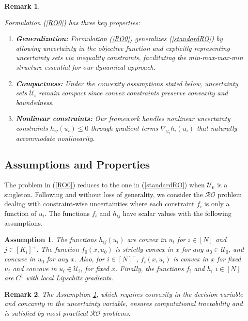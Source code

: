 \documentclass[journal,twoside,web]{ieeecolor}
\newcommand{\rev}[1]{\textcolor{revisionblue}{#1}}
\newtheorem{assumption}[theorem]{Assumption}
\newtheorem{remark}{Remark}
\begin{document}
\begin{remark} \rev{Formulation (\ref{RO0}) has three key properties:
\begin{enumerate}
\item \textbf{Generalization:} Formulation (\ref{RO0}) generalizes (\ref{standardRO}) by allowing uncertainty in the objective function and explicitly representing uncertainty sets via inequality constraints, facilitating the min-max-max-min structure essential for our dynamical approach.
\item \textbf{Compactness:} Under the convexity assumptions stated below, uncertainty sets $\mathcal{U}_i$ remain compact since convex constraints preserve convexity and boundedness.
\item \textbf{Nonlinear constraints:} Our framework handles nonlinear uncertainty constraints $h_{ij}(u_i) \leq 0$ through gradient terms $\nabla_{u_i} h_i(u_i)$ that naturally accommodate nonlinearity.
\end{enumerate}}
\end{remark}

\subsection*{\rev{Assumptions and Properties}}

The problem in (\ref{RO0}) reduces to the one in (\ref{standardRO}) when $\mathcal{U}_0$ is a singleton.
Following \cite{bental2009-2} and without loss of generality, we consider the $\mathcal{RO}$ problem dealing with constraint-wise uncertainties where each constraint $f_i$ is only a function of $u_i$.
The functions $f_i$ and $h_{ij}$ have scalar values with the following assumptions.

\begin{assumption}\label{assume1} The functions $h_{ij}(u_i)$ are convex in $u_i$ for $i\in[N]$ and $j\in[K_i]^+$.
The function $f_0(x,u_0)$ is strictly convex in $x$ for any $u_0\in \mathcal{U}_0$, and concave in $u_0$ for any $x$. Also, for $i\in[N]^+$, $f_i(x,u_i)$ is convex in $x$ for fixed $u_i$ and concave in $u_i\in \mathcal{U}_i$, for fixed $x$.
Finally, the functions $f_i$ and $h_i$ $i\in[N]$ are $C^1$ with local Lipschitz gradients.
\end{assumption}

\begin{remark}
\rev{The Assumption \ref{assume1}, which requires convexity in the decision variable and concavity in the uncertainty variable, ensures computational tractability and is satisfied by most practical $\mathcal{RO}$ problems.}
\end{remark}
\end{document}
